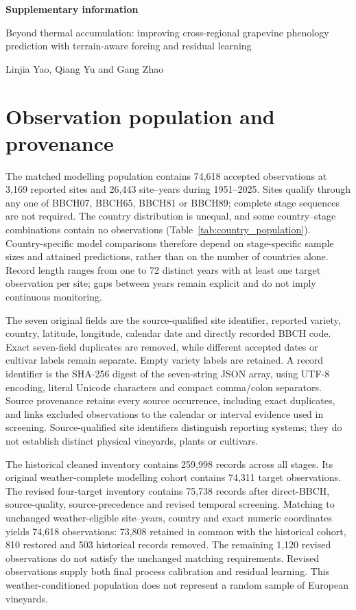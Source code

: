 \documentclass[a4paper,11pt]{article}
\let\OriginalSection\section
\renewcommand{\section}{\FloatBarrier\OriginalSection}
\begin{document}
\begin{center}
{\Large\bfseries Supplementary information}\par
\vspace{0.5em}
{\large Beyond thermal accumulation: improving cross-regional grapevine phenology prediction with terrain-aware forcing and residual learning}\par
\vspace{0.5em}
Linjia Yao, Qiang Yu and Gang Zhao
\end{center}

\section{Observation population and provenance}

The matched modelling population contains 74,618 accepted observations at 3,169
reported sites and 26,443 site--years during 1951--2025. Sites qualify through
any one of BBCH07, BBCH65, BBCH81 or BBCH89; complete stage sequences are not
required. The country distribution is unequal, and some country--stage
combinations contain no observations (Table~\ref{tab:country_population}).
Country-specific model comparisons therefore depend on stage-specific sample
sizes and attained predictions, rather than on the number of countries alone.
Record length ranges from one to 72 distinct years with at least one target
observation per site; gaps between years remain explicit and do not imply
continuous monitoring.

The seven original fields are the source-qualified site identifier, reported
variety, country, latitude, longitude, calendar date and directly recorded BBCH
code. Exact seven-field duplicates are removed, while different accepted dates
or cultivar labels remain separate. Empty variety labels are retained. A
record identifier is the SHA-256 digest of the seven-string JSON array, using
UTF-8 encoding, literal Unicode characters and compact comma/colon separators.
Source provenance retains every source occurrence, including exact duplicates,
and links excluded observations to the calendar or interval evidence used in
screening. Source-qualified site identifiers distinguish reporting systems;
they do not establish distinct physical vineyards, plants or cultivars.

The historical cleaned inventory contains 259,998 records across all stages. Its original weather-complete modelling cohort contains 74,311 target observations. The revised four-target inventory contains 75,738 records after direct-BBCH, source-quality, source-precedence and revised temporal screening. Matching to unchanged weather-eligible site--years, country and exact numeric coordinates yields 74,618 observations: 73,808 retained in common with the historical cohort, 810 restored and 503 historical records removed. The remaining 1,120 revised observations do not satisfy the unchanged matching requirements. Revised observations supply both final process calibration and residual learning. This weather-conditioned population does not represent a random sample of European vineyards.
\end{document}

